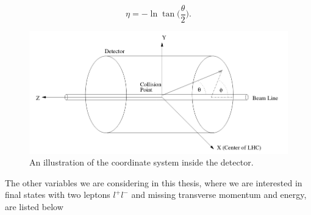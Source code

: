 \begin{equation}
    \eta = -\ln \tan \bigg(\frac{\theta}{2}\bigg).
\end{equation}

\begin{figure}[H]
    \centering
    \includegraphics[width = \textwidth]{Figures/FromOnline/coordinatesystem.png}
    \caption{An illustration of the coordinate system inside the detector\cite{coordinatesystem}.}
    \label{fig:coordsys}
\end{figure}

The other variables we are considering in this thesis, where we are interested in final states with two leptons $l^+ l^-$ and missing transverse momentum and energy, are listed below

